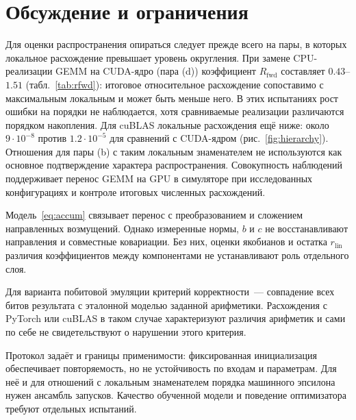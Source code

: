 \section{Обсуждение и ограничения}
\label{sec:discussion}

Для оценки распространения опираться следует прежде всего на пары,
в которых локальное расхождение превышает уровень округления.
При замене CPU-реализации GEMM на CUDA-ядро (пара (d)) коэффициент
$R_{\mathrm{fwd}}$ составляет $0.43$--$1.51$ (табл.~\ref{tab:rfwd}):
итоговое относительное расхождение сопоставимо с максимальным локальным
и может быть меньше него. В этих испытаниях рост ошибки на порядки
не наблюдается, хотя сравниваемые реализации различаются порядком
накопления. Для cuBLAS локальные расхождения ещё ниже:
около $9\cdot10^{-8}$ против $1.2\cdot10^{-5}$ для сравнений
с CUDA-ядром (рис.~\ref{fig:hierarchy}). Отношения для пары (b)
с таким локальным знаменателем не используются как основное
подтверждение характера распространения.
Совокупность наблюдений поддерживает перенос GEMM на GPU
в симуляторе при исследованных конфигурациях
и контроле итоговых численных расхождений.

Модель~\eqref{eq:accum} связывает перенос с преобразованием и сложением
направленных возмущений. Однако измеренные нормы, $b$ и $c$
не восстанавливают направления и совместные ковариации.
Без них, оценки якобианов и остатка $r_{\mathrm{lin}}$ различия
коэффициентов между компонентами не устанавливают роль отдельного слоя.

Для варианта побитовой эмуляции критерий корректности~--- совпадение
всех битов результата с эталонной моделью заданной арифметики.
Расхождения с PyTorch или cuBLAS в таком случае характеризуют различия
арифметик и сами по себе не свидетельствуют о нарушении этого критерия.

Протокол задаёт и границы применимости: фиксированная инициализация
обеспечивает повторяемость, но не устойчивость по входам и параметрам.
Для неё и для отношений с локальным знаменателем порядка машинного эпсилона нужен ансамбль
запусков. Качество обученной модели и поведение оптимизатора требуют
отдельных испытаний.
